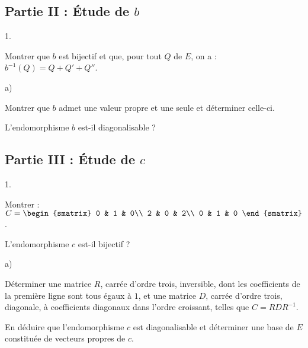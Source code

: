 

\subsection*{Partie II : Étude de $b$}

\begin{noliste}{1.}
  \setlength{\itemsep}{2mm} %
  \setcounter{enumi}{3}
\item Montrer que $b$ est bijectif et que, pour tout $Q$ de $E$, on a
  : $b^{-1}(Q) = Q + Q' + Q''$.

  




\item 
  \begin{noliste}{a)}
  \item Montrer que $b$ admet une valeur propre et une seule et
    déterminer celle-ci.
	
    
    
  \item L'endomorphisme $b$ est-il diagonalisable ?
    
    
  \end{noliste}
\end{noliste}


\newpage


\subsection*{Partie III : Étude de $c$}

\begin{noliste}{1.}
\setlength{\itemsep}{2mm}
\setcounter{enumi}{5}
\item Montrer : $C=\begin{smatrix}
0 & 1 & 0\\ 
2 & 0 & 2\\ 
0 & 1 & 0
\end{smatrix}$.



\item L'endomorphisme $c$ est-il bijectif ?

  




\item 
  \begin{noliste}{a)}
  \item Déterminer une matrice $R$, carrée d'ordre trois, inversible,
    dont les coefficients de la première ligne sont tous égaux à $1$,
    et une matrice $D$, carrée d'ordre trois, diagonale, à
    coefficients diagonaux dans l'ordre croissant, telles que $C =
    RDR^{-1}$.
    
    
    


	
  \item En déduire que l'endomorphisme $c$ est diagonalisable et
    déterminer une base de $E$ constituée de vecteurs propres de
    $c$.
    
    
  \end{noliste}
\end{noliste}


